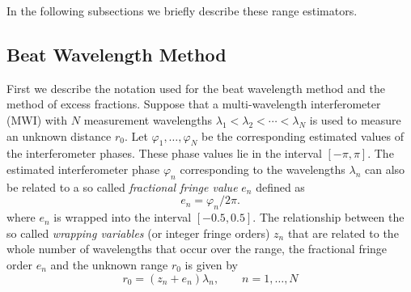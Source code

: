 In the following subsections we briefly describe these range estimators. 
\subsection{Beat Wavelength Method}
First we describe the notation used for the beat wavelength method and the method of excess fractions. Suppose that a multi-wavelength interferometer (MWI) with $N$  measurement wavelengths $\lambda_1< \lambda_2< \cdots< \lambda_N$ is used to measure an unknown distance $r_0$. Let $\varphi_1,\ldots,\varphi_N$ be the corresponding estimated values of the interferometer phases. These phase values lie in the interval $[-\pi, \pi]$. The estimated interferometer phase $\varphi_n$ corresponding to the wavelengths $\lambda_n$ can also be related to a so called \emph{fractional fringe value} $e_n$ defined as~\cite{Falaggis-generalized-th-of-PU-2012}
\[
e_n = \varphi_n/2\pi.
\]
where $e_n$ is wrapped into the interval $[-0.5, 0.5]$. The relationship between the so called \emph{wrapping variables} (or integer fringe orders) $z_n$ that are related to the whole number of wavelengths that occur over the range, the fractional fringe order $e_n$ and the unknown range $r_0$ is given by
\begin{equation}\label{eq:r0-zn-yn}
r_0 = (z_n + e_n)\lambda_n, \qquad n=1,\ldots,N
\end{equation}

